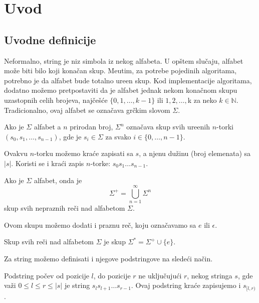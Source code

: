 \section{Uvod}
\subsection{Uvodne definicije}

Neformalno, string je niz simbola iz nekog alfabeta. U op\v stem slu\v caju, alfabet mo\v ze biti bilo koji kona\v can skup. Me\dj utim, za potrebe pojedinih algoritama, potrebno je da alfabet bude totalno ure\dj en skup. Kod implementacije algoritama, dodatno mo\v zemo pretpostaviti da je alfabet jednak nekom kona\v cnom skupu uzastopnih celih brojeva, naj\v ce\v s\' ce $\{ 0, 1, \ldots, k-1\}$ ili $1, 2, \ldots, $k za neko $k \in \mathbb{N}$. Tradicionalno, ovaj alfabet se ozna\v cava gr\v ckim slovom $\Sigma$.

\begin{dfn}
Ako je $\Sigma$ alfabet a $n$ prirodan broj, $\Sigma^n$ ozna\v cava skup svih ure\dj enih $n$-torki $(s_0, s_1, \ldots, s_{n-1})$, gde je $s_i \in \Sigma$ za svako $i \in \{0, \ldots, n-1\}$.
\end{dfn}

Ovakvu $n$-torku mo\v zemo kra\' ce zapisati sa $s$, a njenu du\v zinu (broj elemenata) sa $|s|$. Koristi se i kra\' ci zapis $n$-torke: $s_0s_1\ldots s_{n-1}$.

\begin{dfn}
Ako je $\Sigma$ alfabet, onda je
$$
    \Sigma^+ = \bigcup_{n=1}^{\infty} \Sigma^n
$$
skup svih nepraznih re\v ci nad alfabetom $\Sigma$.
\end{dfn}

Ovom skupu mo\v zemo dodati i praznu re\v c, koju ozna\v cavamo sa $e$ ili $\epsilon$.

\begin{dfn}
Skup svih re\v ci nad alfabetom $\Sigma$ je skup $\Sigma^* = \Sigma^+ \cup \{e\}$.
\end{dfn}

Za string mo\v zemo definisati i njegove podstringove na slede\' ci na\v cin.

\begin{dfn}
Podstring po\v cev od pozicije $l$, do pozicije $r$ ne uklju\v cuju\' ci $r$, nekog stringa $s$, gde va\v zi $0 \leq l \leq r \leq |s|$ je string $s_ls_{l+1}\ldots s_{r-1}$. Ovaj podstring kra\' ce zapisujemo i $s_{[l,r)}$.
\end{dfn}

